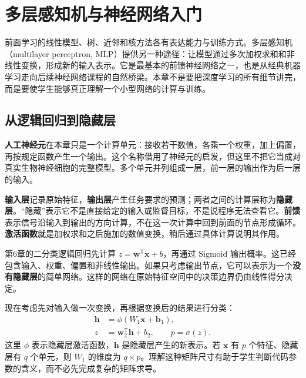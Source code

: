 \chapter{多层感知机与神经网络入门}

前面学习的线性模型、树、近邻和核方法各有表达能力与训练方式。多层感知机（multilayer perceptron, MLP）提供另一种途径：让模型通过多次加权求和和非线性变换，形成新的输入表示。它是最基本的前馈神经网络之一，也是从经典机器学习走向后续神经网络课程的自然桥梁。本章不是要把深度学习的所有细节讲完，而是要使学生能够真正理解一个小型网络的计算与训练。
\section{从逻辑回归到隐藏层}

\textbf{人工神经元}在本章只是一个计算单元：接收若干数值，各乘一个权重，加上偏置，再按规定函数产生一个输出。这个名称借用了神经元的启发，但这里不把它当成对真实生物神经细胞的完整模型。多个单元并列组成一层，前一层的输出作为后一层的输入。

\textbf{输入层}记录原始特征，\textbf{输出层}产生任务要求的预测；两者之间的计算层称为\textbf{隐藏层}。“隐藏”表示它不是直接给定的输入或监督目标，不是说程序无法查看它。\textbf{前馈}表示信号沿输入到输出的方向计算，不在这一次计算中回到前面的节点形成循环。\textbf{激活函数}就是加权求和之后施加的数值变换，稍后通过具体计算说明其作用。

第6章的二分类逻辑回归先计算 $z=\mathbf w^\mathsf T\mathbf x+b$，再通过 Sigmoid 输出概率。这已经包含输入、权重、偏置和非线性输出。如果只考虑输出节点，它可以表示为一个\textbf{没有隐藏层}的简单网络。这样的网络在原始特征空间中的决策边界仍由线性得分决定。

现在考虑先对输入做一次变换，再根据变换后的结果进行分类：
\begin{align}
\mathbf h&=\phi(W_1\mathbf x+\mathbf b_1),\\
z&=\mathbf w_2^\mathsf T\mathbf h+b_2,\qquad p=\sigma(z).
\end{align}
这里 $\phi$ 表示隐藏层激活函数，$\mathbf h$ 是隐藏层产生的新表示。若 $\mathbf x$ 有 $p$ 个特征、隐藏层有 $q$ 个单元，则 $W_1$ 的维度为 $q\times p$。理解这种矩阵尺寸有助于学生判断代码参数的含义，而不必先完成复杂的矩阵求导。


